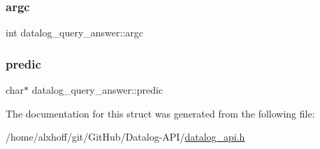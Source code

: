 \mbox{\label{structdatalog__query__answer_a29951460bcc8f936f7f349c851ba3819}} 
\subsubsection{\texorpdfstring{argc}{argc}}
{\footnotesize\ttfamily int datalog\+\_\+query\+\_\+answer\+::argc}

\mbox{\label{structdatalog__query__answer_a721776aabf590192c96df972333d38d4}} 
\subsubsection{\texorpdfstring{predic}{predic}}
{\footnotesize\ttfamily char$\ast$ datalog\+\_\+query\+\_\+answer\+::predic}



The documentation for this struct was generated from the following file\+:\begin{DoxyCompactItemize}
\item 
/home/alxhoff/git/\+Git\+Hub/\+Datalog-\/\+A\+P\+I/\hyperlink{datalog__api_8h}{datalog\+\_\+api.\+h}\end{DoxyCompactItemize}
